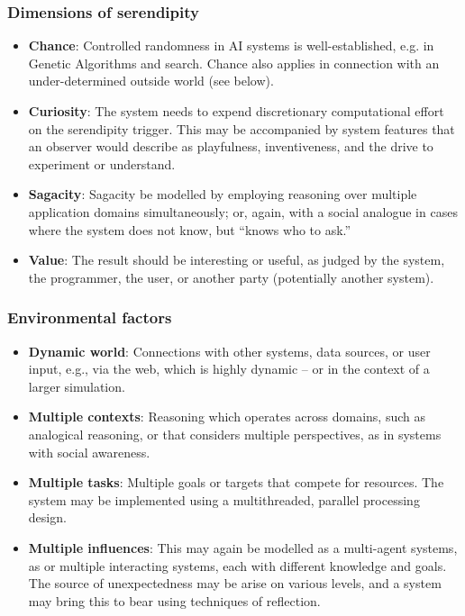 \subsubsection*{Dimensions of serendipity}

\begin{itemize}
\item \textbf{Chance}: Controlled randomness in AI systems is
  well-established, e.g. in Genetic Algorithms and search.  Chance
  also applies in connection with an under-determined outside world
  (see below).
\item \textbf{Curiosity}: The system needs to expend discretionary
  computational effort on the serendipity trigger.  This may be
  accompanied by system features that an observer would describe as
  playfulness, inventiveness, and the drive to experiment or
  understand.
\item \textbf{Sagacity}: Sagacity be modelled by employing reasoning
  over multiple application domains simultaneously; or, again, with a
  social analogue in cases where the system does not know, but ``knows
  who to ask.''
\item \textbf{Value}: The result should be interesting or useful, as
  judged by the system, the programmer, the user, or another party
  (potentially another system).
\end{itemize}

\subsubsection*{Environmental factors}

\begin{itemize}
\item \textbf{Dynamic world}: Connections with other systems, data
  sources, or user input, e.g., via the web, which is highly dynamic --
  or in the context of a larger simulation.
\item \textbf{Multiple contexts}: Reasoning which operates across
  domains, such as analogical reasoning, or that considers multiple
  perspectives, as in systems with social awareness.
\item \textbf{Multiple tasks}: Multiple goals or targets that compete
  for resources.  The system may be implemented using a multithreaded,
  parallel processing design.
\item \textbf{Multiple influences}: This may again be modelled as a
  multi-agent systems, as or multiple interacting systems, each with
  different knowledge and goals.  The source of unexpectedness may be
  arise on various levels, and a system may bring this to bear using
  techniques of reflection.
\end{itemize}

